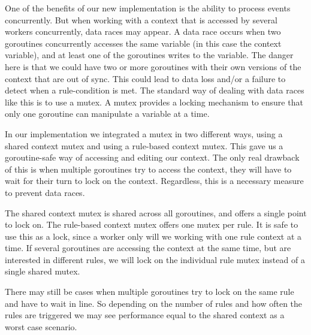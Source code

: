 One of the benefits of our new implementation is the ability to process events concurrently. But when working with a context that is accessed by several workers concurrently, data races may appear. A data race occurs when two goroutines concurrently accesses the same variable (in this case the context variable), and at least one of the goroutines writes to the variable. The danger here is that we could have two or more goroutines with their own versions of the context that are out of sync. This could lead to data loss and/or a failure to detect when a rule-condition is met. The standard way of dealing with data races like this is to use a mutex. A mutex provides a locking mechanism to ensure that only one goroutine can manipulate a variable at a time.

In our implementation we integrated a mutex in two different ways, using a shared context mutex and using a rule-based context mutex. This gave us a goroutine-safe way of accessing and editing our context. The only real drawback of this is when multiple goroutines try to access the context, they will have to wait for their turn to lock on the context. Regardless, this is a necessary measure to prevent data races.

The shared context mutex is shared across all goroutines, and offers a single point to lock on. The rule-based context mutex offers one mutex per rule. It is safe to use this as a lock, since a worker only will we working with one rule context at a time. If several goroutines are accessing the context at the same time, but are interested in different rules, we will lock on the individual rule mutex instead of a single shared mutex.

There may still be cases when multiple goroutines try to lock on the same rule and have to wait in line. So depending on the number of rules and how often the rules are triggered we may see performance equal to the shared context as a worst case scenario.

